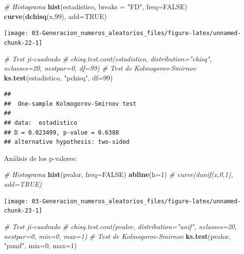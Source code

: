 \documentclass[]{book}
\newenvironment{Shaded}{\begin{snugshade}}{\end{snugshade}}
\newcommand{\KeywordTok}[1]{\textcolor[rgb]{0.13,0.29,0.53}{\textbf{#1}}}
\newcommand{\DataTypeTok}[1]{\textcolor[rgb]{0.13,0.29,0.53}{#1}}
\newcommand{\DecValTok}[1]{\textcolor[rgb]{0.00,0.00,0.81}{#1}}
\newcommand{\StringTok}[1]{\textcolor[rgb]{0.31,0.60,0.02}{#1}}
\newcommand{\CommentTok}[1]{\textcolor[rgb]{0.56,0.35,0.01}{\textit{#1}}}
\newcommand{\OtherTok}[1]{\textcolor[rgb]{0.56,0.35,0.01}{#1}}
\newcommand{\NormalTok}[1]{#1}
\theoremstyle{definition}
\theoremstyle{definition}
\theoremstyle{definition}
\theoremstyle{remark}
\begin{document}
\begin{Shaded}
\begin{Highlighting}[]
\CommentTok{# Histograma}
\KeywordTok{hist}\NormalTok{(estadistico, }\DataTypeTok{breaks =} \StringTok{"FD"}\NormalTok{, }\DataTypeTok{freq=}\OtherTok{FALSE}\NormalTok{)}
\KeywordTok{curve}\NormalTok{(}\KeywordTok{dchisq}\NormalTok{(x,}\DecValTok{99}\NormalTok{), }\DataTypeTok{add=}\OtherTok{TRUE}\NormalTok{)}
\end{Highlighting}
\end{Shaded}

\begin{center}\texttt{[image: 03-Generacion\_numeros\_aleatorios\_files/figure-latex/unnamed-chunk-22-1]} \end{center}

\begin{Shaded}
\begin{Highlighting}[]
\CommentTok{# Test ji-cuadrado}
\CommentTok{# chisq.test.cont(estadistico, distribution="chisq", nclasses=20, nestpar=0, df=99)}
\CommentTok{# Test de Kolmogorov-Smirnov}
\KeywordTok{ks.test}\NormalTok{(estadistico, }\StringTok{"pchisq"}\NormalTok{, }\DataTypeTok{df=}\DecValTok{99}\NormalTok{)}
\end{Highlighting}
\end{Shaded}

\begin{verbatim}
## 
##  One-sample Kolmogorov-Smirnov test
## 
## data:  estadistico
## D = 0.023499, p-value = 0.6388
## alternative hypothesis: two-sided
\end{verbatim}

Análisis de los p-valores:

\begin{Shaded}
\begin{Highlighting}[]
\CommentTok{# Histograma}
\KeywordTok{hist}\NormalTok{(pvalor, }\DataTypeTok{freq=}\OtherTok{FALSE}\NormalTok{)}
\KeywordTok{abline}\NormalTok{(}\DataTypeTok{h=}\DecValTok{1}\NormalTok{) }\CommentTok{# curve(dunif(x,0,1), add=TRUE)}
\end{Highlighting}
\end{Shaded}

\begin{center}\texttt{[image: 03-Generacion\_numeros\_aleatorios\_files/figure-latex/unnamed-chunk-23-1]} \end{center}

\begin{Shaded}
\begin{Highlighting}[]
\CommentTok{# Test ji-cuadrado}
\CommentTok{# chisq.test.cont(pvalor, distribution="unif", nclasses=20, nestpar=0, min=0, max=1)}
\CommentTok{# Test de Kolmogorov-Smirnov}
\KeywordTok{ks.test}\NormalTok{(pvalor, }\StringTok{"punif"}\NormalTok{,  }\DataTypeTok{min=}\DecValTok{0}\NormalTok{, }\DataTypeTok{max=}\DecValTok{1}\NormalTok{)}
\end{Highlighting}
\end{Shaded}
\end{document}
